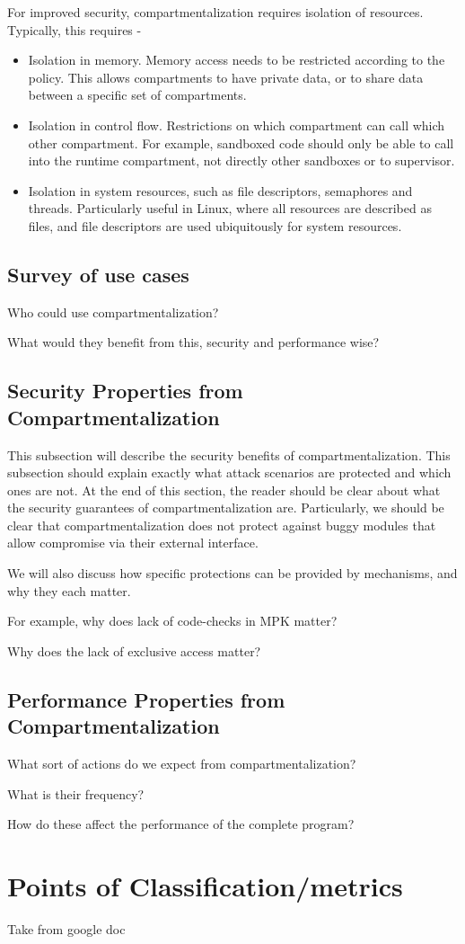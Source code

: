 For improved security, compartmentalization requires isolation of resources.
Typically, this requires - 
\begin{itemize}
  \item Isolation in memory. Memory access needs to be restricted according to
        the policy. This allows compartments to have private data, or to
        share data between a specific set of compartments.
  \item Isolation in control flow. Restrictions on which compartment can call
        which other compartment. 
        For example, sandboxed code should only be able to call into the
        runtime compartment, not directly other sandboxes or to supervisor.
  \item Isolation in system resources, such as file descriptors, semaphores
        and threads. 
        Particularly useful in Linux, where all resources are described as
        files, and file descriptors are used ubiquitously for system resources.

\end{itemize}

\subsection{Survey of use cases}

Who could use compartmentalization?

What would they benefit from this, security and performance wise?

\subsection{Security Properties from Compartmentalization}
This subsection will describe the security benefits of compartmentalization. This subsection should explain exactly what attack scenarios are protected and which ones are not. At the end of this section, the reader should be clear about what the security guarantees of compartmentalization are. Particularly, we should be clear that compartmentalization does not protect against buggy modules that allow compromise via their external interface.

We will also discuss how specific protections can be provided by mechanisms, and
why they each matter.

For example, why does lack of code-checks in MPK matter?

Why does the lack of exclusive access matter?

\subsection{Performance Properties from Compartmentalization}

What sort of actions do we expect from compartmentalization?

What is their frequency?

How do these affect the performance of the complete program?


\section{Points of Classification/metrics}

Take from google doc


